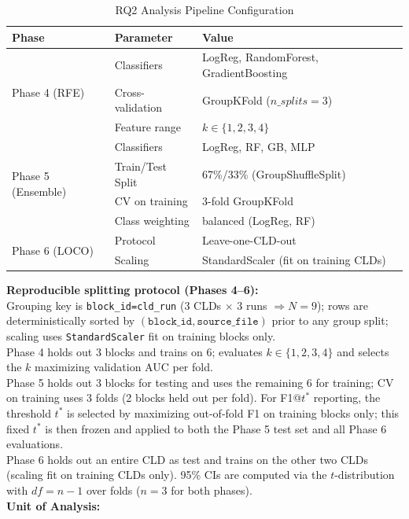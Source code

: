 \begin{table}[H]
\centering
\caption{RQ2 Analysis Pipeline Configuration}
\label{tab:rq2_analysis_pipeline_config}
\footnotesize
\begin{tabular}{@{}lll@{}}
\toprule
\textbf{Phase} & \textbf{Parameter} & \textbf{Value} \\
\midrule
\multirow{3}{*}{Phase 4 (RFE)} & Classifiers & LogReg, RandomForest, GradientBoosting \\
 & Cross-validation & GroupKFold ($n\_splits=3$) \\
 & Feature range & $k \in \{1,2,3,4\}$ \\
\midrule
\multirow{4}{*}{Phase 5 (Ensemble)} & Classifiers & LogReg, RF, GB, MLP \\
 & Train/Test Split & 67\%/33\% (GroupShuffleSplit) \\
 & CV on training & 3-fold GroupKFold \\
 & Class weighting & balanced (LogReg, RF) \\
\midrule
\multirow{2}{*}{Phase 6 (LOCO)} & Protocol & Leave-one-CLD-out \\
 & Scaling & StandardScaler (fit on training CLDs) \\
\bottomrule
\end{tabular}
\end{table}
\textbf{Reproducible splitting protocol (Phases 4--6):}\\
Grouping key is \texttt{block\_id=cld\_run} (3 CLDs $\times$ 3 runs $\Rightarrow N{=}9$); rows are deterministically sorted by \((\texttt{block\_id}, \texttt{source\_file})\) prior to any group split; scaling uses \texttt{StandardScaler} fit on training blocks only.\\
Phase 4 holds out 3 blocks and trains on 6; evaluates \(k \in \{1,2,3,4\}\) and selects the \(k\) maximizing validation AUC per fold.\\
Phase 5 holds out 3 blocks for testing and uses the remaining 6 for training; CV on training uses 3 folds (2 blocks held out per fold). For F1@$t^*$ reporting, the threshold $t^*$ is selected by maximizing out-of-fold F1 on training blocks only; this fixed $t^*$ is then frozen and applied to both the Phase 5 test set and all Phase 6 evaluations.\\
Phase 6 holds out an entire CLD as test and trains on the other two CLDs (scaling fit on training CLDs only). 95\% CIs are computed via the $t$-distribution with $df=n-1$ over folds ($n=3$ for both phases).\\
\textbf{Unit of Analysis:}\\

